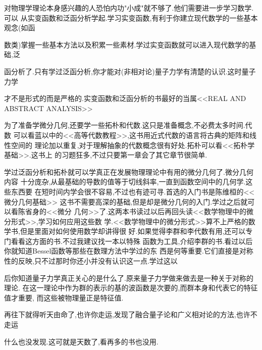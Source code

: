 对物理学理论本身感兴趣的人恐怕内功"小成"就不够了.他们需要进一步学习数学.可以
从实变函数和泛函分析学起.学习实变函数,有利于你建立现代数学的一些基本观念(如函

数类)掌握一些基本方法以及积累一些素材.学过实变函数就可以进入现代数学的基础,泛

函分析了.只有学过泛函分析,你才能对(非相对论)量子力学有清楚的认识.这时量子力学

才不是形式的而是严格的.实变函数和泛函分析的书最好的当属<<REAL AND ABSTRACT
ANALYSIS>>

为了准备学微分几何,还要学一些拓朴和代数.这只是准备概念,不必费太多时间.代数
可以看蓝以中的<<高等代数教程>>,这书用近式代数的语言将古典的矩阵和线性空间的
理论加以重复,对于理解抽象的代数概念很有好处.拓朴可以看<<拓朴学基础>>.这书上
的习题狂多,不过只要第一章会了其它章节很简单.

学过泛函分析和拓朴就可以学真正在发展物理理论中有用的微分几何了.微分几何内容
十分庞杂,从最基础的导数的值等于切线斜率,一直到函数空间中的几何学.这些东西要
在短时间内学会很不容易,不过也有迹可寻.首选的入门书是陈维桓的<<微分几何基础>>
这书不需要高深的基础,但是却是微分几何的入门.学过之后就可以看陈省身的<<微分
几何>>了.这两本书读过以后再回头读<<数学物理中的微分形式>>,学习如何应用这些数
学.<<数学物理中的微分形式>>算不上严格的数学书,但是里面对如何使用数学却讲得很
好.如果觉得李群和李代数有用,还可以专门看看这方面的书.不过我建议找一本以特殊
函数为工具,介绍李群的书.看过以后你就知道Bessel函数等那些在数理方法中学过的东
西是何等重要.它们直接是对称性的反映,只不过那时你还小并没有认识这一点.学过这以

后你知道量子力学真正关心的是什么了.原来量子力学做来做去是一种关于对称的理论.
在这一理论中作为群的表示的基的波函数是次要的,而群本身和代表它的特征值才重要,
而这些被物理量正是特征值.

再往下就得听天由命了,也许你走运,发现了融合量子论和广义相对论的方法,也许不走运

什么也没发现.这可就是天数了,看再多的书也没用. 